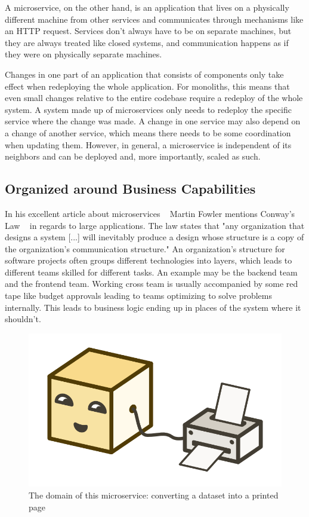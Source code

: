 A microservice, on the other hand, is an application that lives on a physically different machine from other services and communicates through mechanisms like an HTTP request. Services don't always have to be on separate machines, but they are always treated like closed systems, and communication happens as if they were on physically separate machines.

Changes in one part of an application that consists of components only take effect when redeploying the whole application. For monoliths, this means that even small changes relative to the entire codebase require a redeploy of the whole system. A system made up of microservices only needs to redeploy the specific service where the change was made. A change in one service may also depend on a change of another service, which means there needs to be some coordination when updating them. However, in general, a microservice is independent of its neighbors and can be deployed and, more importantly, scaled as such.


\subsection{Organized around Business Capabilities}
\label{sec:theory:what:capabilities}

In his excellent article about microservices ~\cite{microservices.2014} Martin Fowler mentions Conway's Law ~\cite{conway.1968} in regards to large applications. The law states that "any organization that designs a system [...] will inevitably produce a design whose structure is a copy of the organization's communication structure." An organization's structure for software projects often groups different technologies into layers, which leads to different teams skilled for different tasks. An example may be the backend team and the frontend team. Working cross team is usually accompanied by some red tape like budget approvals leading to teams optimizing to solve problems internally. This leads to business logic ending up in places of the system where it shouldn't.

\begin{figure}[ht]
  \centering
  \includegraphics[width=0.4\linewidth]{assets/illustration-microservice-printer.png}
  \caption{The domain of this microservice: converting a dataset into a printed page}
\end{figure}

